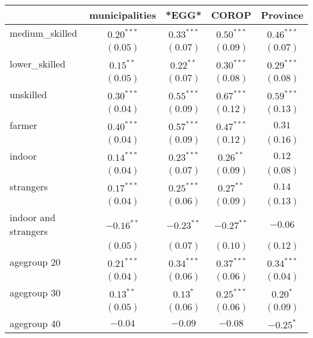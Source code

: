 
\begin{table}
\begin{center}
\begin{tabular}{l c c c c}
\hline
 & municipalities & *EGG* & COROP & Province \\
\hline
medium\_skilled      & $0.20^{***}$  & $0.33^{***}$  & $0.50^{***}$  & $0.46^{***}$  \\
                     & $(0.05)$      & $(0.07)$      & $(0.09)$      & $(0.07)$      \\
lower\_skilled       & $0.15^{**}$   & $0.22^{**}$   & $0.30^{***}$  & $0.29^{***}$  \\
                     & $(0.05)$      & $(0.07)$      & $(0.08)$      & $(0.08)$      \\
unskilled            & $0.30^{***}$  & $0.55^{***}$  & $0.67^{***}$  & $0.59^{***}$  \\
                     & $(0.04)$      & $(0.09)$      & $(0.12)$      & $(0.13)$      \\
farmer               & $0.40^{***}$  & $0.57^{***}$  & $0.47^{***}$  & $0.31$        \\
                     & $(0.04)$      & $(0.09)$      & $(0.12)$      & $(0.16)$      \\
indoor               & $0.14^{***}$  & $0.23^{***}$  & $0.26^{**}$   & $0.12$        \\
                     & $(0.04)$      & $(0.07)$      & $(0.09)$      & $(0.08)$      \\
strangers            & $0.17^{***}$  & $0.25^{***}$  & $0.27^{**}$   & $0.14$        \\
                     & $(0.04)$      & $(0.06)$      & $(0.09)$      & $(0.13)$      \\
indoor and strangers & $-0.16^{**}$  & $-0.23^{**}$  & $-0.27^{**}$  & $-0.06$       \\
                     & $(0.05)$      & $(0.07)$      & $(0.10)$      & $(0.12)$      \\
agegroup 20          & $0.21^{***}$  & $0.34^{***}$  & $0.37^{***}$  & $0.34^{***}$  \\
                     & $(0.04)$      & $(0.06)$      & $(0.06)$      & $(0.04)$      \\
agegroup 30          & $0.13^{**}$   & $0.13^{*}$    & $0.25^{***}$  & $0.20^{*}$    \\
                     & $(0.05)$      & $(0.06)$      & $(0.06)$      & $(0.09)$      \\
agegroup 40          & $-0.04$       & $-0.09$       & $-0.08$       & $-0.25^{*}$   \\

\end{tabular}
\end{center}
\end{table}

